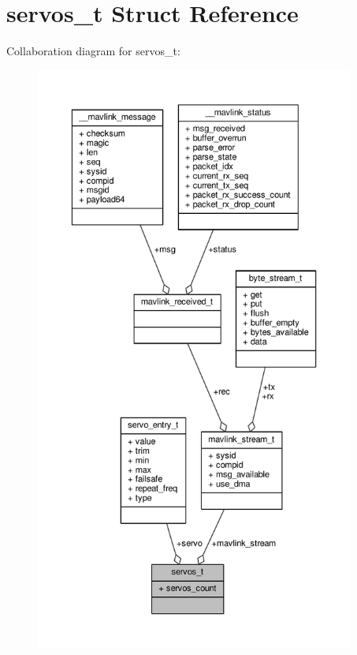 \hypertarget{structservos__t}{\section{servos\+\_\+t Struct Reference}
\label{structservos__t}
}


Collaboration diagram for servos\+\_\+t\+:
\nopagebreak
\begin{figure}[H]
\begin{center}
\leavevmode
\includegraphics[height=550pt]{structservos__t__coll__graph}
\end{center}
\end{figure}

